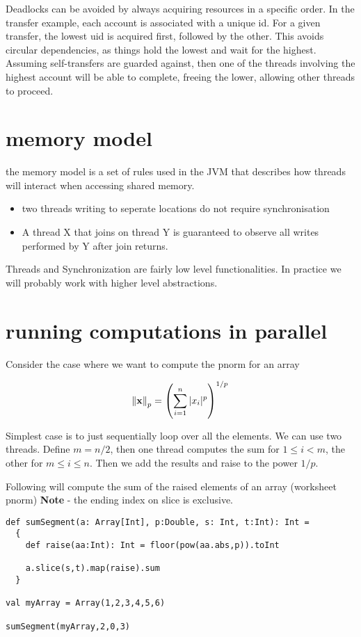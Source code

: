 Deadlocks can be avoided by always acquiring resources in a specific order. In the transfer example, each account is associated with a unique id. For a given transfer, the lowest uid is acquired first, followed by the other. This avoids circular dependencies, as things hold the lowest and wait for the highest. Assuming self-transfers are guarded against, then one of the threads involving the highest account will be able to complete, freeing the lower, allowing other threads to proceed. 

\section{memory model}
the memory model is a set of rules used in the JVM that describes how threads will interact when accessing shared memory.

\begin{itemize}
    \item two threads writing to seperate locations do not require synchronisation
    \item A thread X that joins on thread Y is guaranteed to observe all writes performed by Y after join returns.
\end{itemize}

Threads and Synchronization are fairly low level functionalities. In practice we will probably work with higher level abstractions.


\section{running computations in parallel}

Consider the case where we want to compute the pnorm for an array

\begin{equation}
\norm{\mathbf{x}}_p = \left(\sum_{i=1}^{n} |x_i|^p \right)^{1/p}
\end{equation}


Simplest case is to just sequentially loop over all the elements.
We can use two threads. Define $m=n/2$, then one thread computes the sum for $1 \leq i < m$, the other for $m \leq i \leq n$. Then we add the results and raise to the power $1/p$.

Following will compute the sum of the raised elements of an array (worksheet pnorm)
{\bf Note} - the ending index on slice is exclusive.
\begin{lstlisting}
def sumSegment(a: Array[Int], p:Double, s: Int, t:Int): Int =
  {
    def raise(aa:Int): Int = floor(pow(aa.abs,p)).toInt

    a.slice(s,t).map(raise).sum
  }

val myArray = Array(1,2,3,4,5,6)

sumSegment(myArray,2,0,3)
\end{lstlisting}

